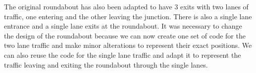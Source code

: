 \documentclass{article}
\begin{document}
	\noindent The original roundabout has also been adapted to have 3 exits with two lanes of traffic, one entering and the other leaving the junction. 
	There is also a single lane entrance and a single lane exits at the roundabout.
	 It was necessary to change the design of the roundabout because we can now create one set of code for the two lane traffic and make minor alterations to represent their exact positions. 
	 We can also reuse the code for the single lane traffic and adapt it to represent the traffic leaving and exiting the roundabout through the single lanes. 



	
\end{document}

